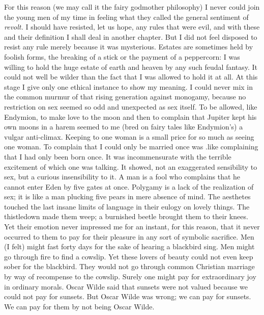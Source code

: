 \documentclass{book}
\begin{document}
For this reason (we may call it the fairy godmother philosophy) I never could join the young men of my time in feeling what they called the general sentiment of \emph{revolt.} I should have resisted, let us hope, any rules that were evil, and with these and their definition I shall deal in another chapter. But I did not feel disposed to resist any rule merely because it was mysterious. Estates are sometimes held by foolish forms, the breaking of a stick or the payment of a peppercorn: I was willing to hold the huge estate of earth and heaven by any such feudal fantasy. It could not well be wilder than the fact that I was allowed to hold it at all. At this stage I give only one ethical instance to show my meaning. I could never mix in the common murmur of that rising generation against monogamy, because no restriction on sex seemed so odd and unexpected as sex itself. To be allowed, like Endymion, to make love to the moon and then to complain that Jupiter kept his own moons in a harem seemed to me (bred on fairy tales like Endymion’s) a vulgar anti-climax. Keeping to one woman is a small price for so much as seeing one woman. To complain that I could only be married once was .like complaining that I had only been born once. It was incommensurate with the terrible excitement of which one was talking. It showed, not an exaggerated sensibility to sex, but a curious insensibility to it. A man is a fool who complains that he cannot enter Eden by five gates at once. Polygamy is a lack of the realization of sex; it is like a man plucking five pears in mere absence of mind. The aesthetes touched the last insane limits of language in their eulogy on lovely things. The thistledown made them weep; a burnished beetle brought them to their knees. Yet their emotion never impressed me for an instant, for this reason, that it never occurred to them to pay for their pleasure in any sort of symbolic sacrifice. Men (I felt) might fast forty days for the sake of hearing a blackbird sing. Men might go through fire to find a cowslip. Yet these lovers of beauty could not even keep sober for the blackbird. They would not go through common Christian marriage by way of recompense to the cowslip. Surely one might pay for extraordinary joy in ordinary morals. Oscar Wilde said that sunsets were not valued because we could not pay for sunsets. But Oscar Wilde was wrong; we can pay for sunsets. We can pay for them by not being Oscar Wilde.
\end{document}
